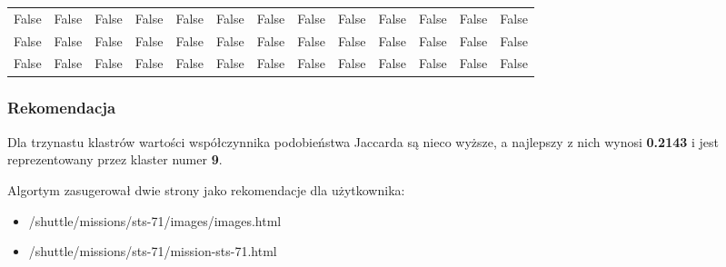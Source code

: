 \documentclass{classrep}
\begin{document}
\begin{table}[H]
{\begin{tabular}{@{}lcccccccccccc@{}}
False  &  False  &  False  &  False  &  False  &  False  &  False  &  False  &  False  &  False  &  False  &  False  &  False\\
False  &  False  &  False  &  False  &  False  &  False  &  False  &  False  &  False  &  False  &  False  &  False  &  False\\
False  &  False  &  False  &  False  &  False  &  False  &  False  &  False  &  False  &  False  &  False  &  False  &  False\\



    \bottomrule
    \end{tabular}%
    }
    \end{table}

\newpage
\subsubsection{Rekomendacja}
Dla trzynastu klastrów wartości współczynnika podobieństwa Jaccarda są nieco wyższe, a najlepszy z nich wynosi \textbf{0.2143} i jest reprezentowany przez klaster numer \textbf{9}.

\begin{table}[H]
\centering
\caption{Wartość współczynnika podobieństwa Jaccarda}
\label{tab:apriori_num_params}
\end{table}
Algortym zasugerował dwie strony jako rekomendacje dla użytkownika:
\begin{itemize}
  \item /shuttle/missions/sts-71/images/images.html
  \item /shuttle/missions/sts-71/mission-sts-71.html
\end{itemize}
\end{document}
